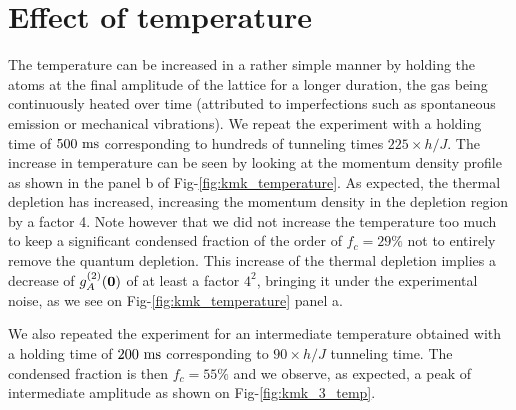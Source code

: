 \section{Effect of temperature}

The temperature can be increased in a rather simple manner by holding the atoms at the final amplitude of the lattice for a longer duration, the gas being continuously heated over time (attributed to imperfections such as spontaneous emission or mechanical vibrations). We repeat the experiment with a holding time of $500 \ \rm{ms}$ corresponding to hundreds of tunneling times $225 \times h/J$. The increase in temperature can be seen by looking at the momentum density profile as shown in the panel b of Fig-\ref{fig:kmk_temperature}. As expected, the thermal depletion has increased, increasing the momentum density in the depletion region by a factor 4. Note however that we did not increase the temperature too much to keep a significant condensed fraction of the order of $f_c = 29 \%$ not to entirely remove the quantum depletion. This increase of the thermal depletion implies a decrease of $g^{(2)}_A (\bm{0})$ of at least a factor $4^2$, bringing it under the experimental noise, as we see on Fig-\ref{fig:kmk_temperature} panel a.

We also repeated the experiment for an intermediate temperature obtained with a holding time of $200 \ \rm{ms}$ corresponding to $90 \times h/J$ tunneling time. The condensed fraction is then $f_c=55 \%$ and we observe, as expected, a peak of intermediate amplitude as shown on Fig-\ref{fig:kmk_3_temp}.

